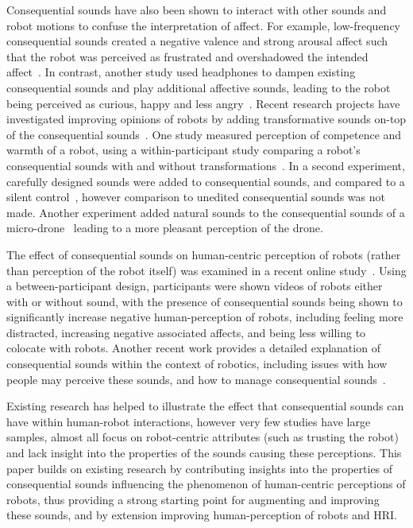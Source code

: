 Consequential sounds have also been shown to interact with other sounds and robot motions to confuse the interpretation of affect. For example, low-frequency consequential sounds created a negative valence and strong arousal affect such that the robot was perceived as frustrated and overshadowed the intended affect~\cite{Frid2018,Frid2022}. In contrast, another study used headphones to dampen existing consequential sounds and play additional affective sounds, leading to the robot being perceived as curious, happy and less angry~\cite{Frederiksen2019}. Recent research projects have investigated improving opinions of robots by adding transformative sounds on-top of the consequential sounds~\cite{Zhang2021b,Robinson2021,Wang2023}. One study measured perception of competence and warmth of a robot, using a within-participant study comparing a robot's consequential sounds with and without transformations~\cite{Zhang2021b}. In a second experiment, carefully designed sounds were added to consequential sounds, and compared to a silent control~\cite{Robinson2021}, however comparison to unedited consequential sounds was not made. Another experiment added natural sounds to the consequential sounds of a micro-drone~\cite{Wang2023} leading to a more pleasant perception of the drone.

The effect of consequential sounds on human-centric perception of robots (rather than perception of the robot itself) was examined in a recent online study~\cite{Allen2024e1p1}. Using a between-participant design, participants were shown videos of robots either with or without sound, with the presence of consequential sounds being shown to significantly increase negative human-perception of robots, including feeling more distracted, increasing negative associated affects, and being less willing to colocate with robots. Another recent work provides a detailed explanation of consequential sounds within the context of robotics, including issues with how people may perceive these sounds, and how to manage consequential sounds~\cite{Allen2023}.

Existing research has helped to illustrate the effect that consequential sounds can have within human-robot interactions, however very few studies have large samples, almost all focus on robot-centric attributes (such as trusting the robot) and lack insight into the properties of the sounds causing these perceptions. This paper builds on existing research by contributing insights into the properties of consequential sounds influencing the phenomenon of human-centric perceptions of robots, thus providing a strong starting point for augmenting and improving these sounds, and by extension improving human-perception of robots and HRI.